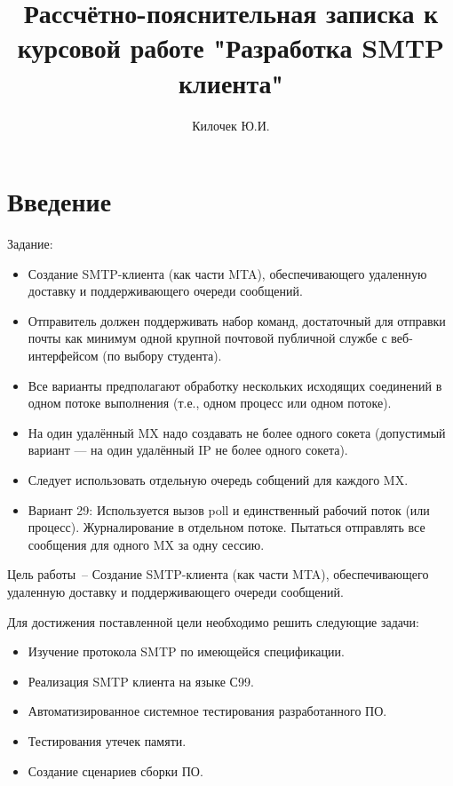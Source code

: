 \documentclass[a4paper,12pt]{report}
\title{Рассчётно-пояснительная записка к курсовой работе
       "Разработка SMTP клиента"}
\author{Килочек Ю.И.}
\begin{document}
\maketitle

\tableofcontents

\cleardoublepage
{}
{}
\chapter*{Введение}

Задание:
\begin{itemize}
\item Создание SMTP-клиента (как части MTA), обеспечивающего удаленную доставку
      и поддерживающего очереди сообщений.
\item Отправитель должен поддерживать набор команд, достаточный для отправки
      почты как минимум одной крупной почтовой публичной службе с
      веб-интерфейсом (по выбору студента).
\item Все варианты предполагают обработку нескольких исходящих соединений в
      одном потоке выполнения (т.е., одном процесс или одном потоке).
\item На один удалённый MX надо создавать не более одного сокета (допустимый
      вариант — на один удалённый IP не более одного сокета).
\item Следует использовать отдельную очередь собщений для каждого MX.
\item Вариант 29: Используется вызов poll и единственный рабочий поток (или
      процесс). Журналирование в отдельном потоке. Пытаться отправлять все
      сообщения для одного MX за одну сессию.
\end{itemize}

Цель работы~-- Создание SMTP-клиента (как части MTA), обеспечивающего удаленную
доставку и поддерживающего очереди сообщений.

Для достижения поставленной цели необходимо решить следующие задачи: 
\begin{itemize}
\item Изучение протокола SMTP по имеющейся спецификации.
\item Реализация SMTP клиента на языке С99.
\item Автоматизированное системное тестирования разработанного ПО. 
\item Тестирования утечек памяти.
\item Создание сценариев сборки ПО.
\end{itemize}
\end{document}
